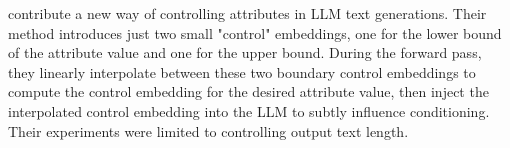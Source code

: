 
\textcite{samuel2025CIEControllingLanguage} contribute a new way of controlling attributes in LLM text generations. Their method introduces just two small "control" embeddings, one for the lower bound of the attribute value and one for the upper bound. During the forward pass, they linearly interpolate between these two boundary control embeddings to compute the control embedding for the desired attribute value, then inject the interpolated control embedding into the LLM to subtly influence conditioning. Their experiments were limited to controlling output text length. 